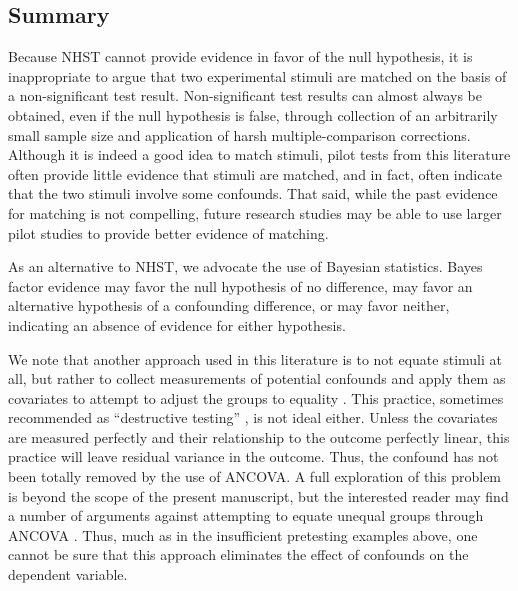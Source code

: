 \documentclass[man]{apa6}
\begin{document}
\subsection{Summary}
Because NHST cannot provide evidence in favor of the null hypothesis, it is inappropriate to argue that two experimental stimuli are matched on the basis of a non-significant test result.  Non-significant test results can almost always be obtained, even if the null hypothesis is false, through collection of an arbitrarily small sample size and application of harsh multiple-comparison corrections.  Although it is indeed a good idea to match stimuli, pilot tests from this literature often provide little evidence that stimuli are matched, and in fact, often indicate that the two stimuli involve some confounds. That said, while the past evidence for matching is not compelling, future research studies may be able to use larger pilot studies to provide better evidence of matching. 
 
As an alternative to NHST, we advocate the use of Bayesian statistics. Bayes factor evidence may favor the null hypothesis of no difference, may favor an alternative hypothesis of a confounding difference, or may favor neither, indicating an absence of evidence for either hypothesis. 

We note that another approach used in this literature is to not equate stimuli at all, but rather to collect measurements of potential confounds and apply them as covariates to attempt to adjust the groups to equality \citep[e.g.,][]{Bushman:Anderson:2002,Bushman:Anderson:2009,Carnagey:etal:2007,Sestir:Bartholow:2010}. This practice, sometimes recommended as ``destructive testing'' \citep{Anderson:Anderson:1996,Prot:Anderson:2013}, is not ideal either. Unless the covariates are measured perfectly and their relationship to the outcome perfectly linear, this practice will leave residual variance in the outcome. Thus, the confound has not been totally removed by the use of ANCOVA. A full exploration of this problem is beyond the scope of the present manuscript, but the interested reader may find a number of arguments against attempting to equate unequal groups through ANCOVA \citep{Miller:Chapman:2001}. 
Thus, much as in the insufficient pretesting examples above, one cannot be sure that this approach eliminates the effect of confounds on the dependent variable. 
\end{document}

